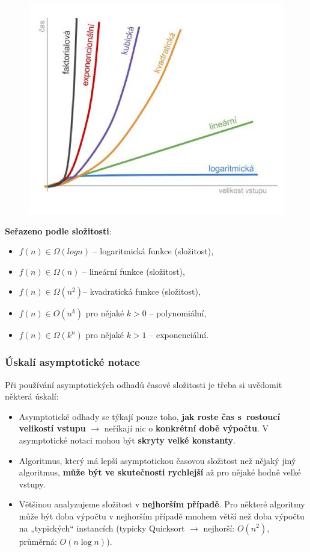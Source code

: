 \begin{minipage}{0.4\textwidth}
\begin{figure}[H]
	\centering
	\includegraphics[width=\textwidth]{assets/asympt}
\end{figure}
\end{minipage}
\begin{minipage}{0.6\textwidth}
\textbf{Seřazeno podle složitosti}:
\small
\begin{itemize}
\item $f(n) \in \Omega(log n)$ -- logaritmická funkce (složitost),
\item $f(n) \in \Omega(n)$ -- lineární funkce (složitost),
\item $f(n) \in \Omega(n^2)$-- kvadratická funkce (složitost),
\item $f(n) \in O(n^k)$ pro nějaké $k > 0$ -- polynomiální,
\item $f(n) \in \Omega(k^n)$ pro nějaké $k > 1$ -- exponenciální.
\end{itemize}
\end{minipage}

\subsubsection{Úskalí asymptotické notace}
Při používání asymptotických odhadů časové složitosti je třeba si uvědomit některá úskalí:
\begin{itemize}
	\item Asymptotické odhady se týkají pouze toho,\textbf{ jak roste čas s rostoucí velikostí vstupu} $\rightarrow$ neříkají nic o \textbf{konkrétní době výpočtu}. V asymptotické notaci mohou být \textbf{skryty velké konstanty}.
	\item Algoritmus, který má lepší asymptotickou časovou složitost než nějaký jiný algoritmus, \textbf{může být ve skutečnosti rychlejší} až pro nějaké hodně velké vstupy.
	\item Většinou analyzujeme složitost v \textbf{nejhorším případě}. Pro některé algoritmy může být doba výpočtu v nejhorším případě mnohem větší než doba výpočtu na „typických“ instancích (typicky Quicksort $\rightarrow$ nejhorší: $O(n^2)$, průměrná: $O(n \log n)$).
\end{itemize}

